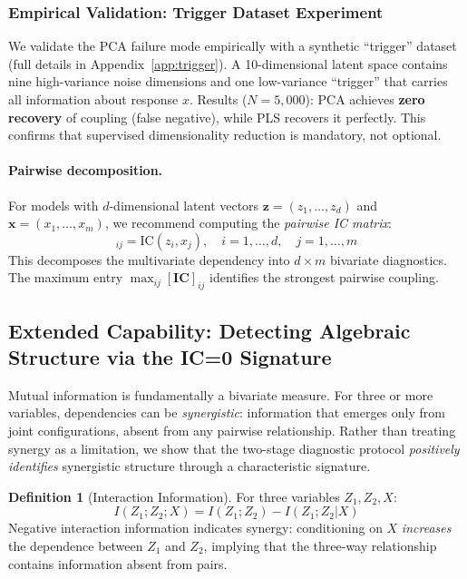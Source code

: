 \documentclass[10pt]{article} %
\theoremstyle{plain}
\theoremstyle{definition}
\newtheorem{definition}[theorem]{Definition}
\newcommand{\IC}{\mathrm{IC}}  %
\begin{document}
\subsubsection{Empirical Validation: Trigger Dataset Experiment}

We validate the PCA failure mode empirically with a synthetic ``trigger'' dataset (full details in Appendix~\ref{app:trigger}). A 10-dimensional latent space contains nine high-variance noise dimensions and one low-variance ``trigger'' that carries all information about response $x$. Results ($N = 5{,}000$): PCA achieves \textbf{zero recovery} of coupling (false negative), while PLS recovers it perfectly. This confirms that supervised dimensionality reduction is mandatory, not optional.

\paragraph{Pairwise decomposition.} For models with $d$-dimensional latent vectors $\mathbf{z} = (z_1, \ldots, z_d)$ and $\mathbf{x} = (x_1, \ldots, x_m)$, we recommend computing the \emph{pairwise IC matrix}:
\begin{equation}
[\mathbf{IC}]_{ij} = \IC(z_i, x_j), \quad i = 1, \ldots, d, \quad j = 1, \ldots, m
\end{equation}
This decomposes the multivariate dependency into $d \times m$ bivariate diagnostics. The maximum entry $\max_{ij} [\mathbf{IC}]_{ij}$ identifies the strongest pairwise coupling.

\subsection{Extended Capability: Detecting Algebraic Structure via the IC=0 Signature}
\label{sec:synergy}

Mutual information is fundamentally a bivariate measure. For three or more variables, dependencies can be \emph{synergistic}: information that emerges only from joint configurations, absent from any pairwise relationship. Rather than treating synergy as a limitation, we show that the two-stage diagnostic protocol \emph{positively identifies} synergistic structure through a characteristic signature.

\begin{definition}[Interaction Information]
For three variables $Z_1, Z_2, X$:
\begin{equation}
I(Z_1; Z_2; X) = I(Z_1; Z_2) - I(Z_1; Z_2 | X)
\end{equation}
Negative interaction information indicates synergy: conditioning on $X$ \emph{increases} the dependence between $Z_1$ and $Z_2$, implying that the three-way relationship contains information absent from pairs.
\end{definition}
\end{document}
